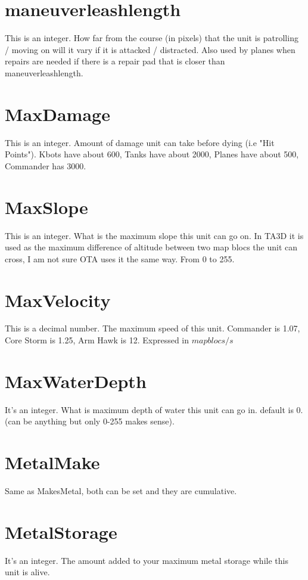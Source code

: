 \documentclass[a4paper,10pt]{article}
\begin{document}
\section{maneuverleashlength}
This is an integer. How far from the course (in pixels) that the unit is patrolling / moving on will it vary if it is attacked / distracted. Also used by planes when repairs are needed if there is a repair pad that is closer than maneuverleashlength.

\section{MaxDamage}
This is an integer. Amount of damage unit can take before dying (i.e "Hit Points").  Kbots have about 600, Tanks have about 2000, Planes have about 500, Commander has 3000.

\section{MaxSlope}
This is an integer. What is the maximum slope this unit can go on. In TA3D it is used as the maximum difference of altitude between two map blocs the unit can cross, I am not sure OTA uses it the same way. From 0 to 255.

\section{MaxVelocity}
This is a decimal number. The maximum speed of this unit. Commander is 1.07, Core Storm is 1.25, Arm Hawk is 12. Expressed in $map blocs/s$

\section{MaxWaterDepth}
It's an integer. What is maximum depth of water this unit can go in. default is 0. (can be anything but only 0-255 makes sense).

\section{MetalMake}
Same as MakesMetal, both can be set and they are cumulative.

\section{MetalStorage}
It's an integer. The amount added to your maximum metal storage while this unit is alive.
\end{document}
